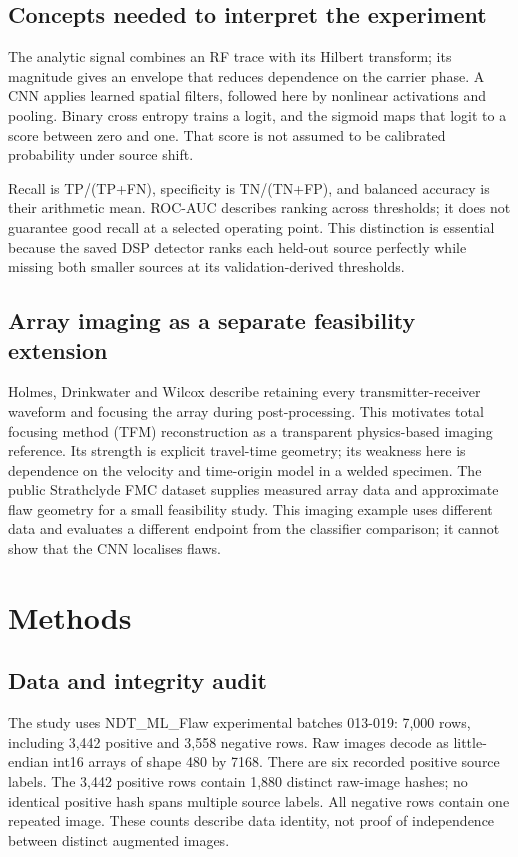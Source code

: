 \documentclass[11pt,a4paper]{article}
\begin{document}
\subsection{Concepts needed to interpret the experiment}

The analytic signal combines an RF trace with its Hilbert transform; its magnitude gives an envelope that reduces dependence on the carrier phase. A CNN applies learned spatial filters, followed here by nonlinear activations and pooling. Binary cross entropy trains a logit, and the sigmoid maps that logit to a score between zero and one. That score is not assumed to be calibrated probability under source shift.

Recall is TP/(TP+FN), specificity is TN/(TN+FP), and balanced accuracy is their arithmetic mean. ROC-AUC describes ranking across thresholds; it does not guarantee good recall at a selected operating point. This distinction is essential because the saved DSP detector ranks each held-out source perfectly while missing both smaller sources at its validation-derived thresholds.

\subsection{Array imaging as a separate feasibility extension}

Holmes, Drinkwater and Wilcox \cite{ref8} describe retaining every transmitter-receiver waveform and focusing the array during post-processing. This motivates total focusing method (TFM) reconstruction as a transparent physics-based imaging reference. Its strength is explicit travel-time geometry; its weakness here is dependence on the velocity and time-origin model in a welded specimen. The public Strathclyde FMC dataset \cite{ref7} supplies measured array data and approximate flaw geometry for a small feasibility study. This imaging example uses different data and evaluates a different endpoint from the classifier comparison; it cannot show that the CNN localises flaws.

\FloatBarrier
\section{Methods}

\subsection{Data and integrity audit}

The study uses NDT\_ML\_Flaw experimental batches 013-019: 7,000 rows, including 3,442 positive and 3,558 negative rows. Raw images decode as little-endian int16 arrays of shape 480 by 7168. There are six recorded positive source labels. The 3,442 positive rows contain 1,880 distinct raw-image hashes; no identical positive hash spans multiple source labels. All negative rows contain one repeated image. These counts describe data identity, not proof of independence between distinct augmented images.
\end{document}

